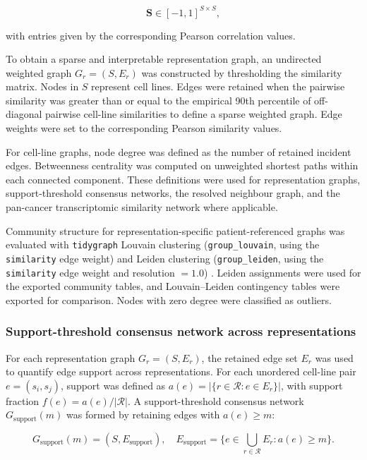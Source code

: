 \begin{equation}
\mathbf{S} \in [-1,1]^{S \times S},
\end{equation}

with entries given by the corresponding Pearson correlation values.

To obtain a sparse and interpretable representation graph,
an undirected weighted graph \(G_r=(S,E_r)\) was constructed by
thresholding the similarity matrix. Nodes in \(S\) represent cell lines.
Edges were retained when the pairwise similarity was greater than or equal to the empirical
90th percentile of off-diagonal pairwise cell-line similarities to define a
sparse weighted graph. Edge weights were set to the corresponding
Pearson similarity values.

For cell-line graphs, node degree was defined as the number of retained
incident edges. Betweenness centrality was computed on unweighted shortest
paths within each connected component. These definitions were used for
representation graphs, support-threshold consensus networks, the resolved
neighbour graph, and the pan-cancer transcriptomic similarity network where
applicable.

Community structure for representation-specific patient-referenced graphs was
evaluated with \texttt{tidygraph} Louvain clustering
(\texttt{group\_louvain}, using the \texttt{similarity} edge weight)
\citep{Blondel2008} and Leiden clustering (\texttt{group\_leiden}, using the
\texttt{similarity} edge weight and resolution \(=1.0\)) \citep{Traag2019}.
Leiden assignments were used for the exported community tables, and
Louvain--Leiden contingency tables were exported for comparison. Nodes with
zero degree were classified as outliers.

\subsubsection{Support-threshold consensus network across representations}

For each representation graph
\(G_r=(S,E_r)\), the retained edge set \(E_r\) was used to quantify
edge support across representations. For each unordered cell-line pair
\(e=(s_i,s_j)\), support was defined as
\(a(e)=|\{r\in\mathcal{R}:e\in E_r\}|\), with support fraction
\(f(e)=a(e)/|\mathcal{R}|\). A support-threshold consensus network
\(G_{\mathrm{support}}(m)\) was formed by retaining edges with
\(a(e)\geq m\):

\begin{equation}
G_{\mathrm{support}}(m)
=
(S,E_{\mathrm{support}}),
\quad
E_{\mathrm{support}}
=
\{e\in \bigcup_{r\in\mathcal{R}}E_r : a(e)\geq m\}.
\end{equation}

